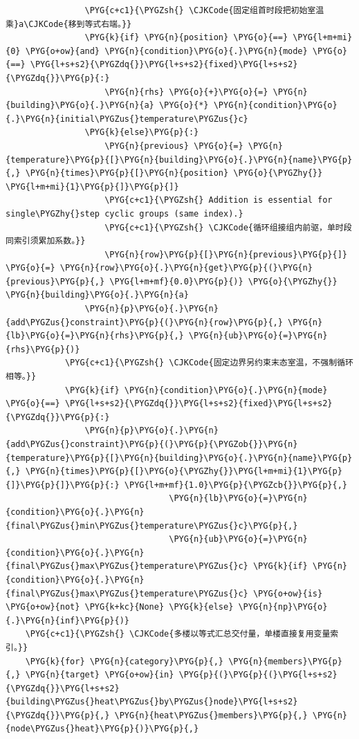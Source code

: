 \begin{Verbatim}
                \PYG{c+c1}{\PYGZsh{} \CJKCode{固定组首时段把初始室温乘}a\CJKCode{移到等式右端。}}
                \PYG{k}{if} \PYG{n}{position} \PYG{o}{==} \PYG{l+m+mi}{0} \PYG{o+ow}{and} \PYG{n}{condition}\PYG{o}{.}\PYG{n}{mode} \PYG{o}{==} \PYG{l+s+s2}{\PYGZdq{}}\PYG{l+s+s2}{fixed}\PYG{l+s+s2}{\PYGZdq{}}\PYG{p}{:}
                    \PYG{n}{rhs} \PYG{o}{+}\PYG{o}{=} \PYG{n}{building}\PYG{o}{.}\PYG{n}{a} \PYG{o}{*} \PYG{n}{condition}\PYG{o}{.}\PYG{n}{initial\PYGZus{}temperature\PYGZus{}c}
                \PYG{k}{else}\PYG{p}{:}
                    \PYG{n}{previous} \PYG{o}{=} \PYG{n}{temperature}\PYG{p}{[}\PYG{n}{building}\PYG{o}{.}\PYG{n}{name}\PYG{p}{,} \PYG{n}{times}\PYG{p}{[}\PYG{n}{position} \PYG{o}{\PYGZhy{}} \PYG{l+m+mi}{1}\PYG{p}{]}\PYG{p}{]}
                    \PYG{c+c1}{\PYGZsh{} Addition is essential for single\PYGZhy{}step cyclic groups (same index).}
                    \PYG{c+c1}{\PYGZsh{} \CJKCode{循环组接组内前驱，单时段同索引须累加系数。}}
                    \PYG{n}{row}\PYG{p}{[}\PYG{n}{previous}\PYG{p}{]} \PYG{o}{=} \PYG{n}{row}\PYG{o}{.}\PYG{n}{get}\PYG{p}{(}\PYG{n}{previous}\PYG{p}{,} \PYG{l+m+mf}{0.0}\PYG{p}{)} \PYG{o}{\PYGZhy{}} \PYG{n}{building}\PYG{o}{.}\PYG{n}{a}
                \PYG{n}{p}\PYG{o}{.}\PYG{n}{add\PYGZus{}constraint}\PYG{p}{(}\PYG{n}{row}\PYG{p}{,} \PYG{n}{lb}\PYG{o}{=}\PYG{n}{rhs}\PYG{p}{,} \PYG{n}{ub}\PYG{o}{=}\PYG{n}{rhs}\PYG{p}{)}
            \PYG{c+c1}{\PYGZsh{} \CJKCode{固定边界另约束末态室温，不强制循环相等。}}
            \PYG{k}{if} \PYG{n}{condition}\PYG{o}{.}\PYG{n}{mode} \PYG{o}{==} \PYG{l+s+s2}{\PYGZdq{}}\PYG{l+s+s2}{fixed}\PYG{l+s+s2}{\PYGZdq{}}\PYG{p}{:}
                \PYG{n}{p}\PYG{o}{.}\PYG{n}{add\PYGZus{}constraint}\PYG{p}{(}\PYG{p}{\PYGZob{}}\PYG{n}{temperature}\PYG{p}{[}\PYG{n}{building}\PYG{o}{.}\PYG{n}{name}\PYG{p}{,} \PYG{n}{times}\PYG{p}{[}\PYG{o}{\PYGZhy{}}\PYG{l+m+mi}{1}\PYG{p}{]}\PYG{p}{]}\PYG{p}{:} \PYG{l+m+mf}{1.0}\PYG{p}{\PYGZcb{}}\PYG{p}{,}
                                 \PYG{n}{lb}\PYG{o}{=}\PYG{n}{condition}\PYG{o}{.}\PYG{n}{final\PYGZus{}min\PYGZus{}temperature\PYGZus{}c}\PYG{p}{,}
                                 \PYG{n}{ub}\PYG{o}{=}\PYG{n}{condition}\PYG{o}{.}\PYG{n}{final\PYGZus{}max\PYGZus{}temperature\PYGZus{}c} \PYG{k}{if} \PYG{n}{condition}\PYG{o}{.}\PYG{n}{final\PYGZus{}max\PYGZus{}temperature\PYGZus{}c} \PYG{o+ow}{is} \PYG{o+ow}{not} \PYG{k+kc}{None} \PYG{k}{else} \PYG{n}{np}\PYG{o}{.}\PYG{n}{inf}\PYG{p}{)}
    \PYG{c+c1}{\PYGZsh{} \CJKCode{多楼以等式汇总交付量，单楼直接复用变量索引。}}
    \PYG{k}{for} \PYG{n}{category}\PYG{p}{,} \PYG{n}{members}\PYG{p}{,} \PYG{n}{target} \PYG{o+ow}{in} \PYG{p}{(}\PYG{p}{(}\PYG{l+s+s2}{\PYGZdq{}}\PYG{l+s+s2}{building\PYGZus{}heat\PYGZus{}by\PYGZus{}node}\PYG{l+s+s2}{\PYGZdq{}}\PYG{p}{,} \PYG{n}{heat\PYGZus{}members}\PYG{p}{,} \PYG{n}{node\PYGZus{}heat}\PYG{p}{)}\PYG{p}{,}

\end{Verbatim}
